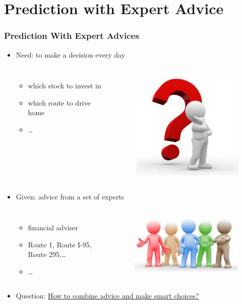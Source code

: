 \documentclass{beamer}
\begin{document}
\section{Prediction with Expert Advice}
\begin{frame}
\frametitle{Prediction With Expert Advices}
\begin{itemize}
\item Need: to make a decision every day
\begin{columns}
	\begin{itemize}
	\item which stock to invest in
	\item which route to drive home
	\item \ldots
	\end{itemize}
\begin{figure}
\includegraphics[scale = 0.25]{question}
\end{figure}
\end{columns}
\pause
\item Given: advice from a set of experts
	\begin{columns}
	\begin{itemize}
	\item financial adviser
	\item Route 1, Route I-95, Route 295,\ldots
	\item \ldots
	\end{itemize}
	\begin{figure}
\includegraphics[scale = 0.25]{experts}
\end{figure}
\end{columns}
\pause	
\item Question:
	\underline{How to combine advice and make smart choices?}
\end{itemize}

\end{frame}
\end{document}
